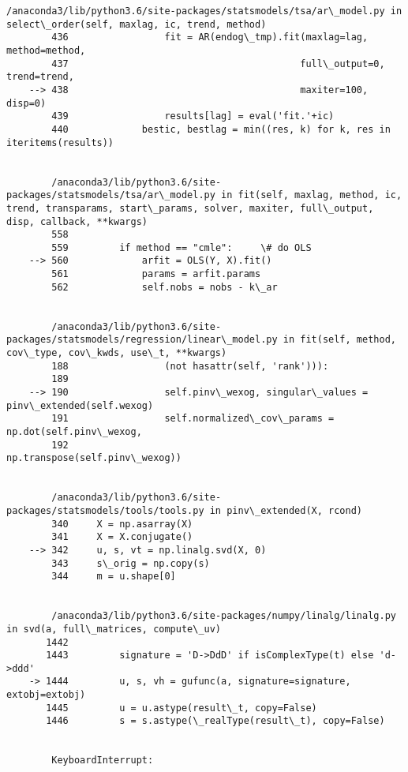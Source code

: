 \documentclass[11pt]{article}
\begin{document}
\begin{Verbatim}[commandchars=\\\{\}]
        /anaconda3/lib/python3.6/site-packages/statsmodels/tsa/ar\_model.py in select\_order(self, maxlag, ic, trend, method)
        436                 fit = AR(endog\_tmp).fit(maxlag=lag, method=method,
        437                                         full\_output=0, trend=trend,
    --> 438                                         maxiter=100, disp=0)
        439                 results[lag] = eval('fit.'+ic)
        440             bestic, bestlag = min((res, k) for k, res in iteritems(results))


        /anaconda3/lib/python3.6/site-packages/statsmodels/tsa/ar\_model.py in fit(self, maxlag, method, ic, trend, transparams, start\_params, solver, maxiter, full\_output, disp, callback, **kwargs)
        558 
        559         if method == "cmle":     \# do OLS
    --> 560             arfit = OLS(Y, X).fit()
        561             params = arfit.params
        562             self.nobs = nobs - k\_ar


        /anaconda3/lib/python3.6/site-packages/statsmodels/regression/linear\_model.py in fit(self, method, cov\_type, cov\_kwds, use\_t, **kwargs)
        188                 (not hasattr(self, 'rank'))):
        189 
    --> 190                 self.pinv\_wexog, singular\_values = pinv\_extended(self.wexog)
        191                 self.normalized\_cov\_params = np.dot(self.pinv\_wexog,
        192                                         np.transpose(self.pinv\_wexog))


        /anaconda3/lib/python3.6/site-packages/statsmodels/tools/tools.py in pinv\_extended(X, rcond)
        340     X = np.asarray(X)
        341     X = X.conjugate()
    --> 342     u, s, vt = np.linalg.svd(X, 0)
        343     s\_orig = np.copy(s)
        344     m = u.shape[0]


        /anaconda3/lib/python3.6/site-packages/numpy/linalg/linalg.py in svd(a, full\_matrices, compute\_uv)
       1442 
       1443         signature = 'D->DdD' if isComplexType(t) else 'd->ddd'
    -> 1444         u, s, vh = gufunc(a, signature=signature, extobj=extobj)
       1445         u = u.astype(result\_t, copy=False)
       1446         s = s.astype(\_realType(result\_t), copy=False)


        KeyboardInterrupt: 

    \end{Verbatim}
\end{document}
